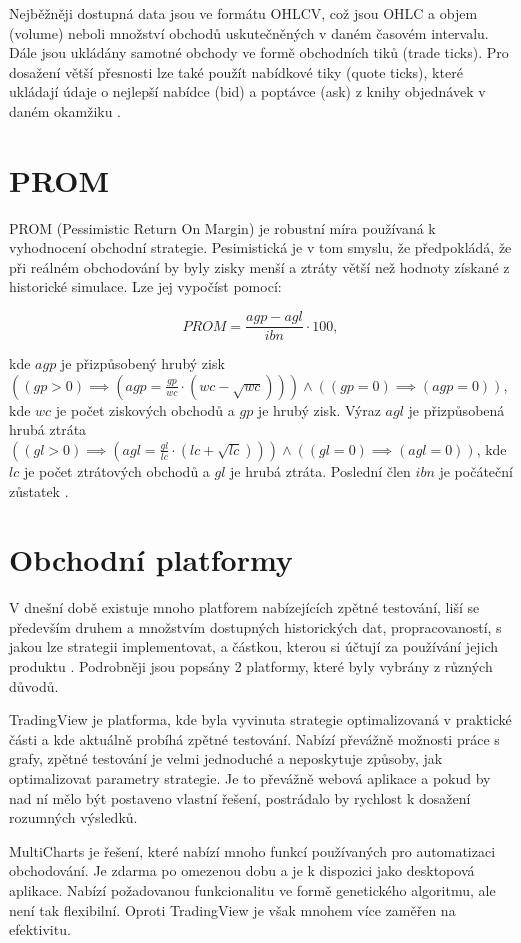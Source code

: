Nejběžněji dostupná data jsou ve formátu OHLCV, což jsou OHLC a objem (volume) neboli množství obchodů uskutečněných v daném časovém intervalu.
Dále jsou ukládány samotné obchody ve formě obchodních tiků (trade ticks).
Pro dosažení větší přesnosti lze také použít nabídkové tiky (quote ticks), které ukládají údaje o nejlepší nabídce (bid) a poptávce (ask) z knihy objednávek v daném okamžiku \cite{polygon}.

\section{PROM}
PROM (Pessimistic Return On Margin) je robustní míra používaná k vyhodnocení obchodní strategie.
Pesimistická je v tom smyslu, že předpokládá, že při reálném obchodování by byly zisky menší a ztráty větší než hodnoty získané z historické simulace.
Lze jej vypočíst pomocí:

\[ PROM = \frac{agp-agl}{ibn} \cdot 100,\]

kde $agp$ je přizpůsobený hrubý zisk $((gp>0)\implies(agp=\frac{gp}{wc}\cdot(wc-\sqrt{wc}))) \land ((gp=0)\implies(agp=0))$, kde $wc$ je počet ziskových obchodů a $gp$ je hrubý zisk.
Výraz $agl$ je přizpůsobená hrubá ztráta $((gl>0)\implies(agl=\frac{gl}{lc}\cdot(lc+\sqrt{lc}))) \land ((gl=0)\implies(agl=0))$, kde $lc$ je počet ztrátových obchodů a $gl$ je hrubá ztráta.
Poslední člen $ibn$ je počáteční zůstatek \cite{pardo}.

\section{Obchodní platformy}
V dnešní době existuje mnoho platforem nabízejících zpětné testování, liší se především druhem a množstvím dostupných historických dat, propracovaností, s jakou lze strategii implementovat, a částkou, kterou si účtují za používání jejich produktu \cite{bowman}.
Podrobněji jsou popsány 2 platformy, které byly vybrány z různých důvodů.

TradingView je platforma, kde byla vyvinuta strategie optimalizovaná v praktické části a kde aktuálně probíhá zpětné testování.
Nabízí převážně možnosti práce s grafy, zpětné testování je velmi jednoduché a neposkytuje způsoby, jak optimalizovat parametry strategie.
Je to převážně webová aplikace a pokud by nad ní mělo být postaveno vlastní řešení, postrádalo by rychlost k dosažení rozumných výsledků.

MultiCharts je řešení, které nabízí mnoho funkcí používaných pro automatizaci obchodování.
Je zdarma po omezenou dobu a je k dispozici jako desktopová aplikace.
Nabízí požadovanou funkcionalitu ve formě genetického algoritmu, ale není tak flexibilní.
Oproti TradingView je však mnohem více zaměřen na efektivitu.

